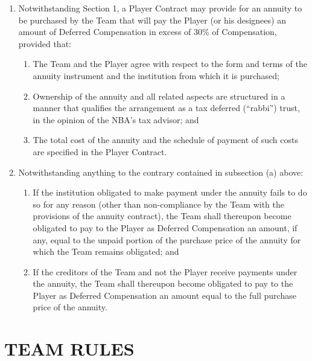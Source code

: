 \documentclass[
]{book}
\providecommand{\tightlist}{%
  \setlength{\itemsep}{0pt}\setlength{\parskip}{0pt}}
\begin{document}
\begin{enumerate}
\def\labelenumi{(\alph{enumi})}
\tightlist
\item
  Notwithstanding Section 1, a Player Contract may provide for an annuity to be purchased by the Team that will pay the Player (or his designees) an amount of Deferred Compensation in excess of 30\% of
  Compensation, provided that:

  \begin{enumerate}
  \def\labelenumii{(\roman{enumii})}
  \tightlist
  \item
    The Team and the Player agree with respect to the form and terms of the annuity instrument and the institution from which it is purchased;
  \item
    Ownership of the annuity and all related aspects are structured in a manner that qualifies the arrangement as a tax deferred (``rabbi'') trust, in the opinion of the NBA's tax advisor; and
  \item
    The total cost of the annuity and the schedule of payment of such costs are specified in the Player Contract.
  \end{enumerate}
\item
  Notwithstanding anything to the contrary contained in subsection (a) above:

  \begin{enumerate}
  \def\labelenumii{(\roman{enumii})}
  \tightlist
  \item
    If the institution obligated to make payment under the annuity fails to do so for any reason (other than non-compliance by the Team with the provisions of the annuity contract), the Team shall thereupon become obligated to pay to the Player as Deferred Compensation an amount, if any, equal to the unpaid portion of the purchase price of the annuity for which the Team remains obligated; and
  \item
    If the creditors of the Team and not the Player receive payments under the annuity, the Team shall thereupon become obligated to pay to the Player as Deferred Compensation an amount equal to the full purchase price of the annuity.
  \end{enumerate}
\end{enumerate}

\hypertarget{team-rules}{%
\chapter{TEAM RULES}\label{team-rules}}
\end{document}
